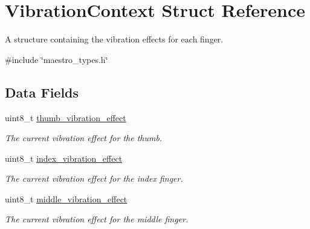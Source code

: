 \hypertarget{struct_vibration_context}{}\section{Vibration\+Context Struct Reference}
\label{struct_vibration_context}


A structure containing the vibration effects for each finger.  




{\ttfamily \#include \char`\"{}maestro\+\_\+types.\+h\char`\"{}}

\subsection*{Data Fields}
\begin{DoxyCompactItemize}
\item 
\mbox{\label{struct_vibration_context_a74de699f8b7645c3de435b5a7c0c2418}} 
uint8\+\_\+t \hyperlink{struct_vibration_context_a74de699f8b7645c3de435b5a7c0c2418}{thumb\+\_\+vibration\+\_\+effect}
\begin{DoxyCompactList}\small\item\em The current vibration effect for the thumb. \end{DoxyCompactList}\item 
\mbox{\label{struct_vibration_context_aed1123261e626637a40324850f0603e6}} 
uint8\+\_\+t \hyperlink{struct_vibration_context_aed1123261e626637a40324850f0603e6}{index\+\_\+vibration\+\_\+effect}
\begin{DoxyCompactList}\small\item\em The current vibration effect for the index finger. \end{DoxyCompactList}\item 
\mbox{\label{struct_vibration_context_ab5999515533d34d98f09c210077c24ec}} 
uint8\+\_\+t \hyperlink{struct_vibration_context_ab5999515533d34d98f09c210077c24ec}{middle\+\_\+vibration\+\_\+effect}
\begin{DoxyCompactList}\small\item\em The current vibration effect for the middle finger. \end{DoxyCompactList}\item 
\mbox{\label{struct_vibration_context_a6189a49a15db4bfafefa9454581b1830}} 

\end{DoxyCompactItemize}
